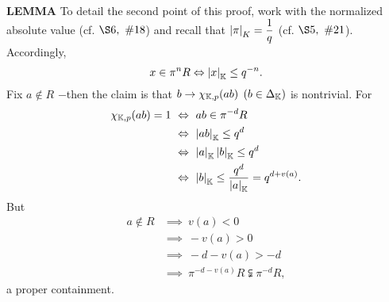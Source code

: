 \begin{x}{\small\bf LEMMA}
To detail the second point of this proof, work with the normalized absolute value 
(cf. $\S 6, \ \# 18$) and recall that 
$\left\vert\pi\right\vert_K = \displaystyle\frac{1}{q}$ 
(cf. $\S 5, \ \# 21$).  
Accordingly, 
\[
x \in \pi^n R \Leftrightarrow \left\vert x\right\vert_{\mathbb{K}} \le q^{-n}.
\]
Fix $a \notin R$ $-$then the claim is that $b \rightarrow \chi_{\mathbb{K},p}(ab)$ $(b \in \Delta_{\mathbb{K}})$ is nontrivial.  
For
\begin{align*}
\chi_{\K,p}(ab) = 1 	\ 
&\Leftrightarrow\  ab \in \pi^{-d}R\\
&\Leftrightarrow\  \abs{ab}_\K \le q^d\\
&\Leftrightarrow\  \abs{a}_\K \abs{b}_\K \le q^d\\
&\Leftrightarrow\   \abs{b}_\K \le \frac{q^d}{\abs{a}_\K} = q^{d+v(a)}.
\end{align*}
But
\begin{align*}
a \notin R 	
&\implies\  v(a) < 0\\
&\implies\  -v(a) > 0\\
&\implies\  -d-v(a) > -d\\
&\implies\ \pi^{-d-v(a)}R \subsetneqq \pi^{-d}R,
\end{align*}
a proper containment.
\end{x}






















